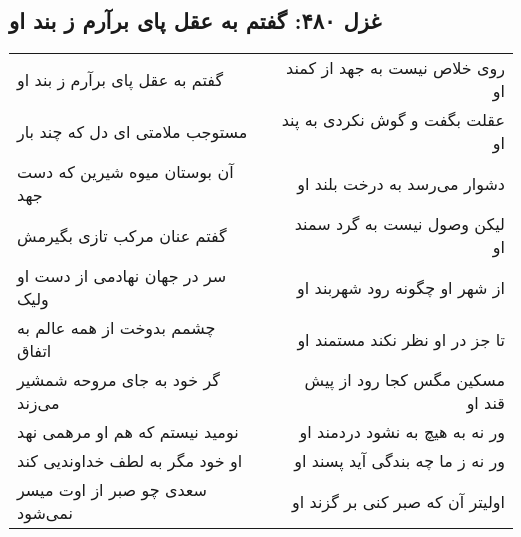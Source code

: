 \begin{center}
\section*{غزل ۴۸۰: گفتم به عقل پای برآرم ز بند او}
\label{sec:480}
\begin{longtable}{l p{0.5cm} r}
گفتم به عقل پای برآرم ز بند او
&&
روی خلاص نیست به جهد از کمند او
\\
مستوجب ملامتی ای دل که چند بار
&&
عقلت بگفت و گوش نکردی به پند او
\\
آن بوستان میوه شیرین که دست جهد
&&
دشوار می‌رسد به درخت بلند او
\\
گفتم عنان مرکب تازی بگیرمش
&&
لیکن وصول نیست به گرد سمند او
\\
سر در جهان نهادمی از دست او ولیک
&&
از شهر او چگونه رود شهربند او
\\
چشمم بدوخت از همه عالم به اتفاق
&&
تا جز در او نظر نکند مستمند او
\\
گر خود به جای مروحه شمشیر می‌زند
&&
مسکین مگس کجا رود از پیش قند او
\\
نومید نیستم که هم او مرهمی نهد
&&
ور نه به هیچ به نشود دردمند او
\\
او خود مگر به لطف خداوندیی کند
&&
ور نه ز ما چه بندگی آید پسند او
\\
سعدی چو صبر از اوت میسر نمی‌شود
&&
اولیتر آن که صبر کنی بر گزند او
\\
\end{longtable}
\end{center}
